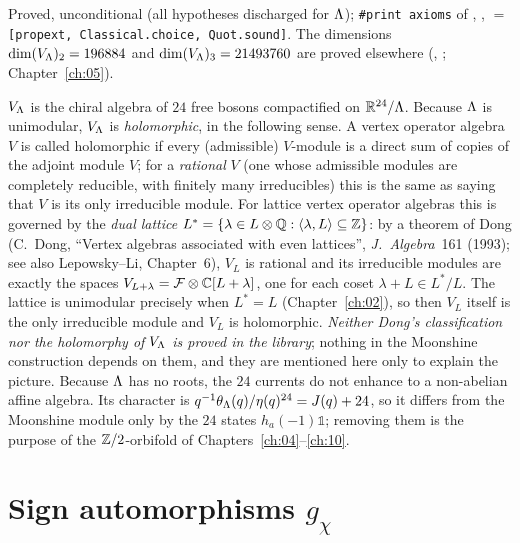 \begin{status}
Proved, unconditional (all hypotheses discharged for ${\Lambda}$);
\texttt{\#print axioms} of , ,
 $=$ \texttt{[propext, Classical.choice, Quot.sound]}. The dimensions
$\dim(V_{\Lambda})_2=196884$ and $\dim(V_{\Lambda})_3=21493760$ are proved elsewhere
(, ; Chapter~\ref{ch:05}).
\end{status}

\begin{remark}
$V_{\Lambda}$ is the chiral algebra of $24$ free bosons compactified on $\mathbb{R}^{24}/{\Lambda}$. Because
${\Lambda}$ is unimodular, $V_{\Lambda}$ is \emph{holomorphic}, in the following sense. A vertex
operator algebra $V$ is called holomorphic if every (admissible) $V$-module is a direct sum of
copies of the adjoint module $V$; for a \emph{rational} $V$ (one whose admissible modules are
completely reducible, with finitely many irreducibles) this is the same as saying that $V$ is its
only irreducible module. For lattice vertex operator algebras this is governed by the
\emph{dual lattice} $L^*=\{\lambda\in L\otimes{\mathbb{Q}}:\langle\lambda,L\rangle\subseteq{\mathbb{Z}}\}$: by a theorem
of Dong (C.~Dong, ``Vertex algebras associated with even lattices'', \emph{J.\ Algebra}~161
(1993); see also Lepowsky--Li, Chapter~6), $V_L$ is rational and its irreducible modules are
exactly the spaces $V_{L+\lambda}=\mathcal F\otimes{\mathbb{C}}[L+\lambda]$, one for each coset
$\lambda+L\in L^*/L$. The lattice is unimodular precisely when $L^*=L$ (Chapter~\ref{ch:02}), so then
$V_L$ itself is the only irreducible module and $V_L$ is holomorphic. \emph{Neither Dong's
classification nor the holomorphy of $V_{\Lambda}$ is proved in the library}; nothing in the
Moonshine construction depends on them, and they are mentioned here only to explain the picture.
Because ${\Lambda}$ has no roots, the $24$ currents do not enhance to a non-abelian affine algebra. Its
character is $q^{-1}\theta_{\Lambda}(q)/\eta(q)^{24}=J(q)+24$, so it differs from the Moonshine
module only by the $24$ states $h_a(-1)\mathbb 1$; removing them is the purpose of the
${\mathbb{Z}}/2$-orbifold of Chapters~\ref{ch:04}--\ref{ch:10}.
\end{remark}

\section{Sign automorphisms \texorpdfstring{$g_\chi$}{g\_chi}}\label{ch03:sec:sign}

